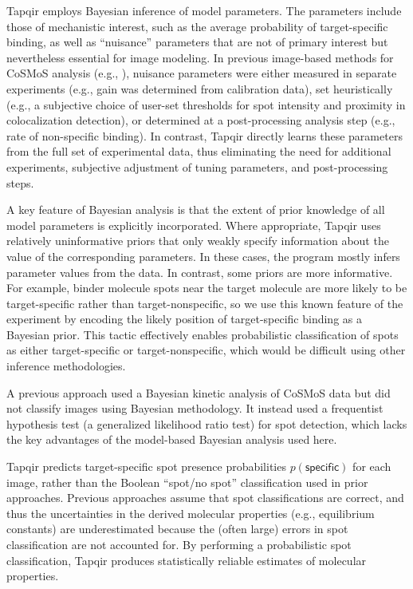 
Tapqir employs Bayesian inference of model parameters. The parameters include those of mechanistic interest, such as the average probability of target-specific binding, as well as ``nuisance'' parameters that are not of primary interest but nevertheless essential for image modeling. In previous image-based methods for CoSMoS analysis (e.g., \cite{Friedman2015-nx,Smith2019-yb}), nuisance parameters were either measured in separate experiments (e.g., gain was determined from calibration data), set heuristically (e.g., a subjective choice of user-set thresholds for spot intensity and proximity in colocalization detection), or determined at a post-processing analysis step (e.g., rate of non-specific binding). In contrast, Tapqir directly learns these parameters from the full set of experimental data, thus eliminating the need for additional experiments, subjective adjustment of tuning parameters, and post-processing steps.

A key feature of Bayesian analysis is that the extent of prior knowledge of all model parameters is explicitly incorporated. Where appropriate, Tapqir uses relatively uninformative priors that only weakly specify information about the value of the corresponding parameters.  In these cases, the program mostly infers parameter values from the data.  In contrast, some priors are more informative.  For example, binder molecule spots near the target molecule are more likely to be target-specific rather than target-nonspecific, so we use this known feature of the experiment by encoding the likely position of target-specific binding as a Bayesian prior. This tactic effectively enables probabilistic classification of spots as either target-specific or target-nonspecific, which would be difficult using other inference methodologies.

A previous approach \cite{Smith2019-yb,Smith2015-gf} used a Bayesian kinetic analysis of CoSMoS data but did not classify images using Bayesian methodology. It instead used a frequentist hypothesis test (a generalized likelihood ratio test) for spot detection, which lacks the key advantages of the model-based Bayesian analysis used here.

Tapqir predicts target-specific spot presence probabilities $p(\mathsf{specific})$ for each image, rather than the Boolean ``spot/no spot'' classification used in prior approaches. Previous approaches assume that spot classifications are correct, and thus the uncertainties in the derived molecular properties (e.g., equilibrium constants) are underestimated because the (often large) errors in spot classification are not accounted for. By performing a probabilistic spot classification, Tapqir produces statistically reliable estimates of molecular properties.

